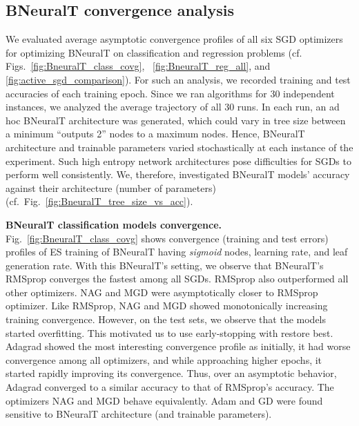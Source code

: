 \documentclass[11pt,a4paper]{article}
\begin{document}
    \subsection{BNeuralT convergence analysis}
    \label{sec:BNeuralT_covergence}
We evaluated average asymptotic convergence profiles of all six SGD optimizers for optimizing BNeuralT on classification and regression problems (cf. Figs.~\ref{fig:BneuralT_class_covg},  ~\ref{fig:BneuralT_reg_all}, and \ref{fig:active_sgd_comparison}). For such an analysis, we recorded training and test accuracies of each training epoch. Since we ran algorithms for 30 independent instances, we analyzed the average trajectory of all 30 runs. In each run, an ad hoc BNeuralT architecture was generated, which could vary  in tree size between a minimum ``outputs  2'' nodes to a maximum  nodes. Hence, BNeuralT architecture and trainable parameters varied stochastically at each instance of the experiment. Such high entropy network architectures pose difficulties for SGDs to perform well consistently. We, therefore, investigated BNeuralT models' accuracy against their architecture (number of parameters) (cf.~Fig.~\ref{fig:BneuralT_tree_size_vs_acc}).
    
    \textbf{BNeuralT classification models convergence.} Fig.~\ref{fig:BneuralT_class_covg} shows convergence (training and test errors) profiles of ES training of BNeuralT having \textit{sigmoid} nodes,  learning rate, and  leaf generation rate. With this BNeuralT's setting, we observe that BNeuralT's RMSprop converges the fastest among all SGDs. RMSprop also outperformed all other optimizers. NAG and MGD were asymptotically closer to RMSprop optimizer. Like RMSprop, NAG and MGD showed monotonically increasing training convergence. However, on the test sets, we observe that the models started overfitting.  This motivated us to use early-stopping with restore best. Adagrad showed the most interesting convergence profile as initially, it had worse convergence among all optimizers, and while approaching higher epochs, it started rapidly improving its convergence. Thus, over an asymptotic behavior, Adagrad converged to a similar accuracy to that of RMSprop's accuracy. The optimizers NAG and MGD behave equivalently. Adam and GD were found sensitive to BNeuralT architecture (and trainable parameters).
    
\end{document}
